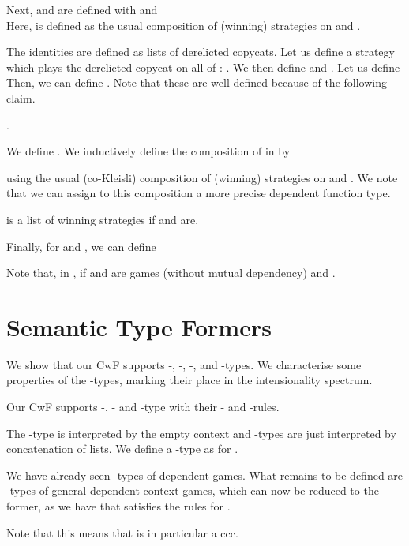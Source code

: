 \documentclass[runningheads,a4paper]{llncs}
\begin{document}
Next,  and  are defined with  and\\
\resizebox{\linewidth}{!}{\parbox{\linewidth}{\vspace{-10pt}
}}\vspace{-5pt}
Here,  is defined as the usual composition of (winning) strategies on  and . 


The identities are defined as lists of derelicted copycats. Let us define a strategy  which plays the derelicted copycat on all of : . We then define  and . Let us define\\ \resizebox{\linewidth}{!}{}\linebreak
Then, we can define . Note that these are well-defined because of the following claim.
\begin{claim}.
\end{claim}
We define  .
We inductively define the composition of  in  by


using the usual (co-Kleisli) composition of (winning) strategies on  and . We note that we can assign to this composition a more precise dependent function type.

\begin{claim}\label{lem:comp}
 is a list of winning strategies if  and  are.
\end{claim}
Finally, for  and , we can define

\begin{remark}Note that, in ,  if  and  are games (without mutual dependency) and .
\end{remark}
\vspace{-12pt}
\section{Semantic Type Formers}
\vspace{-7pt}
We show that our CwF supports -, -, -, and -types. We characterise some properties of the -types, marking their place in the intensionality spectrum.

\begin{theorem}Our CwF supports -, - and -type with their - and -rules.
\end{theorem}
The -type is interpreted by the empty context  and -types are just interpreted by concatenation of lists. We define a -type  as  for
 .

We have already seen -types  of dependent games. What remains to be defined are -types  of general dependent context games, which can now be reduced to the former, as we have that  satisfies the rules for .
\begin{corollary}Note that this means that  is in particular a ccc.\end{corollary}
\end{document}
